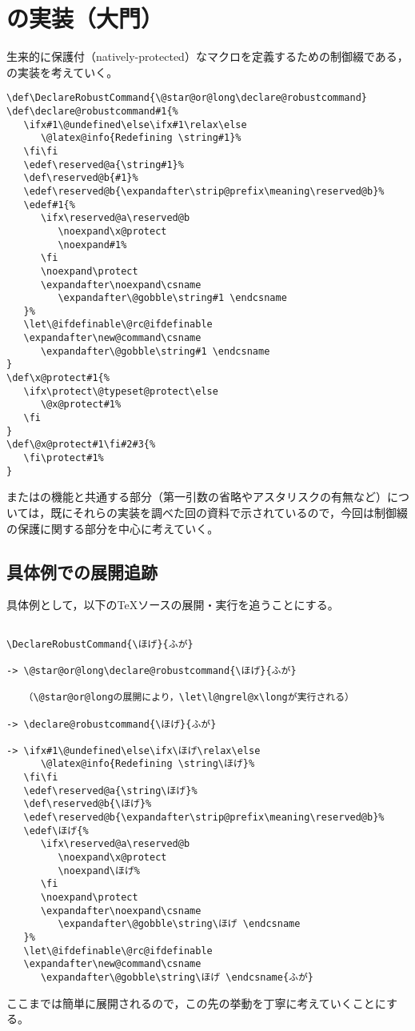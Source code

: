 \documentclass[autodetect-engine,dvipdfmx]{jsarticle}
\begin{document}
\section{の実装（大門）}

生来的に保護付（natively-protected）なマクロを定義するための制御綴である，の実装を考えていく。

\latexltx
\begin{lstlisting}[firstnumber=738]
\def\DeclareRobustCommand{\@star@or@long\declare@robustcommand}
\def\declare@robustcommand#1{%
   \ifx#1\@undefined\else\ifx#1\relax\else
      \@latex@info{Redefining \string#1}%
   \fi\fi
   \edef\reserved@a{\string#1}%
   \def\reserved@b{#1}%
   \edef\reserved@b{\expandafter\strip@prefix\meaning\reserved@b}%
   \edef#1{%
      \ifx\reserved@a\reserved@b
         \noexpand\x@protect
         \noexpand#1%
      \fi
      \noexpand\protect
      \expandafter\noexpand\csname
         \expandafter\@gobble\string#1 \endcsname
   }%
   \let\@ifdefinable\@rc@ifdefinable
   \expandafter\new@command\csname
      \expandafter\@gobble\string#1 \endcsname
}
\def\x@protect#1{%
   \ifx\protect\@typeset@protect\else
      \@x@protect#1%
   \fi
}
\def\@x@protect#1\fi#2#3{%
   \fi\protect#1%
}
\end{lstlisting}
またはの機能と共通する部分（第一引数の省略やアスタリスクの有無など）については，既にそれらの実装を調べた回の資料で示されているので，今回は制御綴の保護に関する部分を中心に考えていく。

\subsection{具体例での展開追跡}

具体例として，以下の\TeX ソースの展開・実行を追うことにする。
\texsource
\begin{lstlisting}

\DeclareRobustCommand{\ほげ}{ふが}

-> \@star@or@long\declare@robustcommand{\ほげ}{ふが}

   （\@star@or@longの展開により，\let\l@ngrel@x\longが実行される）

-> \declare@robustcommand{\ほげ}{ふが}

-> \ifx#1\@undefined\else\ifx\ほげ\relax\else
      \@latex@info{Redefining \string\ほげ}%
   \fi\fi
   \edef\reserved@a{\string\ほげ}%
   \def\reserved@b{\ほげ}%
   \edef\reserved@b{\expandafter\strip@prefix\meaning\reserved@b}%
   \edef\ほげ{%
      \ifx\reserved@a\reserved@b
         \noexpand\x@protect
         \noexpand\ほげ%
      \fi
      \noexpand\protect
      \expandafter\noexpand\csname
         \expandafter\@gobble\string\ほげ \endcsname
   }%
   \let\@ifdefinable\@rc@ifdefinable
   \expandafter\new@command\csname
      \expandafter\@gobble\string\ほげ \endcsname{ふが}
\end{lstlisting}
ここまでは簡単に展開されるので，この先の挙動を丁寧に考えていくことにする。
\end{document}
